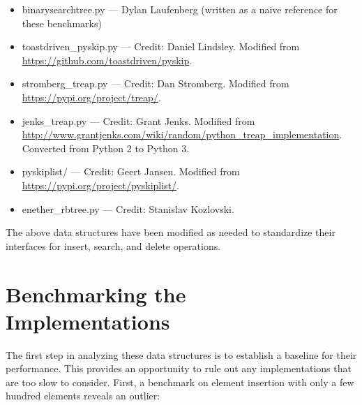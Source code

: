 \documentclass{article}
\begin{document}
\begin{itemize}
    \item binarysearchtree.py --- Dylan Laufenberg (written as a naive reference for these benchmarks)
    \item toastdriven\_pyskip.py --- Credit: Daniel Lindsley. Modified from \url{https://github.com/toastdriven/pyskip}.
    \item stromberg\_treap.py --- Credit: Dan Stromberg. Modified from \url{https://pypi.org/project/treap/}.
    \item jenks\_treap.py --- Credit: Grant Jenks. Modified from \url{http://www.grantjenks.com/wiki/random/python_treap_implementation}. Converted from Python 2 to Python 3.
    \item pyskiplist/ --- Credit: Geert Jansen. Modified from \url{https://pypi.org/project/pyskiplist/}.
    \item enether\_rbtree.py --- Credit: Stanislav Kozlovski. 
\end{itemize}

The above data structures have been modified as needed to standardize their interfaces for insert, search, and delete operations.

\section{Benchmarking the Implementations}
The first step in analyzing these data structures is to establish a baseline for their performance. This provides an opportunity to rule out any implementations that are too slow to consider. First, a benchmark on element insertion with only a few hundred elements reveals an outlier:
\end{document}
